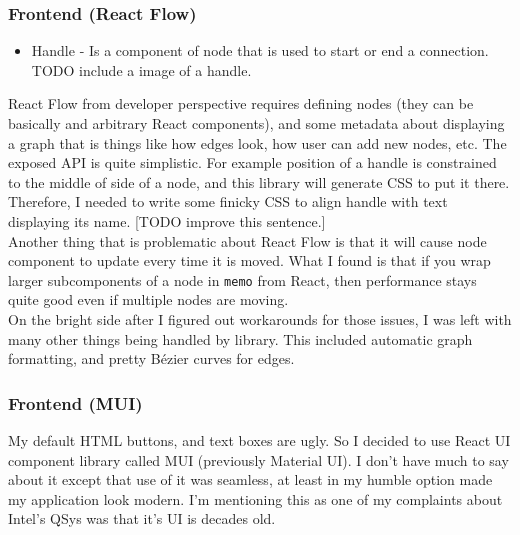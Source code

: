 \documentclass[14pt]{report}
\begin{document}
\subsubsection*{Frontend (React Flow)}
\begin{tcolorbox}[title=Vocabulary]
    \begin{itemize}
        \item Handle - Is a component of node that is used to start or end a connection. TODO include a image of a handle.
    \end{itemize}
\end{tcolorbox}
React Flow from developer perspective requires defining nodes (they can be basically and arbitrary React components), and some metadata about displaying a graph that is things like how edges look, how user can add new nodes, etc. 
The exposed API is quite simplistic. 
For example position of a handle is constrained to the middle of side of a node, and this library will generate CSS to put it there. 
Therefore, I needed to write some finicky CSS to align handle with text displaying its name. [TODO improve this sentence.]
\\
Another thing that is problematic about React Flow is that it will cause node component to update every time it is moved. 
What I found is that if you wrap larger subcomponents of a node in \verb!memo! from React, then performance stays quite good even if multiple nodes are moving.   
\\
On the bright side after I figured out workarounds for those issues, I was left with many other things being handled by library. This included automatic graph formatting, and pretty Bézier curves for edges. 

\subsubsection*{Frontend (MUI)}
My default HTML buttons, and text boxes are ugly. So I decided to use React UI component library called MUI (previously Material UI). I don't have much to say about it except that use of it was seamless, at least in my humble option made my application look modern. I'm mentioning this as one of my complaints about Intel's QSys was that it's UI is decades old.
\end{document}
